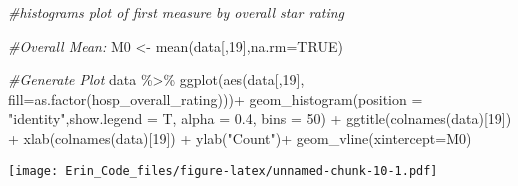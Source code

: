 \documentclass[
]{article}
\newenvironment{Shaded}{\begin{snugshade}}{\end{snugshade}}
\newcommand{\AttributeTok}[1]{\textcolor[rgb]{0.77,0.63,0.00}{#1}}
\newcommand{\CommentTok}[1]{\textcolor[rgb]{0.56,0.35,0.01}{\textit{#1}}}
\newcommand{\ConstantTok}[1]{\textcolor[rgb]{0.00,0.00,0.00}{#1}}
\newcommand{\DecValTok}[1]{\textcolor[rgb]{0.00,0.00,0.81}{#1}}
\newcommand{\FloatTok}[1]{\textcolor[rgb]{0.00,0.00,0.81}{#1}}
\newcommand{\FunctionTok}[1]{\textcolor[rgb]{0.00,0.00,0.00}{#1}}
\newcommand{\NormalTok}[1]{#1}
\newcommand{\OtherTok}[1]{\textcolor[rgb]{0.56,0.35,0.01}{#1}}
\newcommand{\SpecialCharTok}[1]{\textcolor[rgb]{0.00,0.00,0.00}{#1}}
\newcommand{\StringTok}[1]{\textcolor[rgb]{0.31,0.60,0.02}{#1}}
\begin{document}
\begin{Shaded}
\begin{Highlighting}[]
\CommentTok{\#histograms plot of first measure by overall star rating}


\CommentTok{\#Overall Mean:}
\NormalTok{M0 }\OtherTok{\textless{}{-}} \FunctionTok{mean}\NormalTok{(data[,}\DecValTok{19}\NormalTok{],}\AttributeTok{na.rm=}\ConstantTok{TRUE}\NormalTok{)}

\CommentTok{\#Generate Plot}
\NormalTok{data }\SpecialCharTok{\%\textgreater{}\%} \FunctionTok{ggplot}\NormalTok{(}\FunctionTok{aes}\NormalTok{(data[,}\DecValTok{19}\NormalTok{], }\AttributeTok{fill=}\FunctionTok{as.factor}\NormalTok{(hosp\_overall\_rating)))}\SpecialCharTok{+}
  \FunctionTok{geom\_histogram}\NormalTok{(}\AttributeTok{position =} \StringTok{"identity"}\NormalTok{,}\AttributeTok{show.legend =}\NormalTok{ T, }\AttributeTok{alpha =} \FloatTok{0.4}\NormalTok{, }\AttributeTok{bins =} \DecValTok{50}\NormalTok{) }\SpecialCharTok{+}
  \FunctionTok{ggtitle}\NormalTok{(}\FunctionTok{colnames}\NormalTok{(data)[}\DecValTok{19}\NormalTok{]) }\SpecialCharTok{+} 
  \FunctionTok{xlab}\NormalTok{(}\FunctionTok{colnames}\NormalTok{(data)[}\DecValTok{19}\NormalTok{]) }\SpecialCharTok{+} \FunctionTok{ylab}\NormalTok{(}\StringTok{"Count"}\NormalTok{)}\SpecialCharTok{+}
  \FunctionTok{geom\_vline}\NormalTok{(}\AttributeTok{xintercept=}\NormalTok{M0)}
\end{Highlighting}
\end{Shaded}

\texttt{[image: Erin\_Code\_files/figure-latex/unnamed-chunk-10-1.pdf]}
\end{document}
